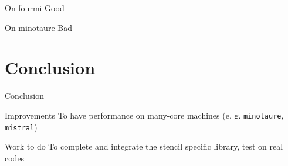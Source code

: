 \documentclass[10pt, compress]{beamer}
\begin{document}
\begin{frame}{On fourmi}
Good
\end{frame}

\begin{frame}{On minotaure}
Bad
\end{frame}


\section{Conclusion}

\begin{frame}{Conclusion}

\begin{block}{Improvements}
To have performance on many-core machines (e. g. \texttt{minotaure}, \texttt{mistral})
\end{block}

\begin{block}{Work to do}
To complete and integrate the stencil specific library, test on real codes
\end{block}

\end{frame}

\end{document}
